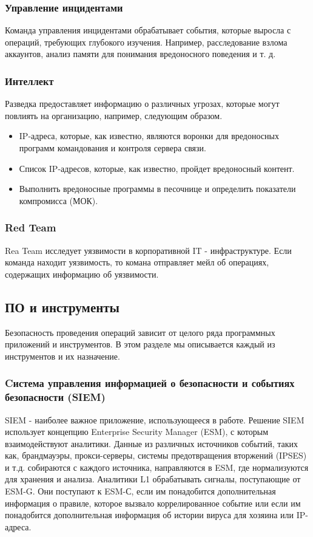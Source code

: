 \documentclass[12pt,]{article}
\begin{document}
\subsubsection{Управление инцидентами}
Команда управления инцидентами обрабатывает события, которые выросла с операций, требующих глубокого изучения. Например, расследование взлома аккаунтов, анализ памяти для понимания вредоносного поведения и т. д.
\subsubsection{Интеллект}
Разведка предоставляет информацию о различных угрозах, которые могут повлиять на организацию, например, следующим образом.
\begin{itemize}
\item IP-адреса, которые, как известно, являются воронки для вредоносных программ  командования и контроля сервера связи.
\item Список IP-адресов, которые, как известно, пройдет вредоносный контент.
\item Выполнить вредоносные программы в песочнице и определить показатели компромисса (МОК).
\end{itemize}
\subsubsection{Red Team}
Rea Team исследует уязвимости в корпоративной IT - инфраструктуре. Если команда находит  уязвимость, то комана отправляет мейл об операциях, содержащих информацию об уязвимости.
\subsection{ПО и инструменты}
Безопасность проведения операций зависит от целого ряда программных приложений и инструментов. В этом разделе мы описывается каждый из инструментов и их назначение.
\subsubsection{Cистема управления информацией о безопасности и событиях безопасности (SIEM)}
SIEM  - наиболее важное приложение, использующееся в работе. Решение SIEM использует концепцию Enterprise Security Manager (ESM), с которым взаимодействуют аналитики. Данные из различных источников событий, таких как, брандмауэры, прокси-серверы, системы предотвращения вторжений (IPSES) и т.д. собираются с каждого источника, направляются в ESM, где нормализуются для хранения и анализа. Аналитики L1 обрабатывать сигналы, поступающие от ESM-G. Они поступают к ESM-С, если им понадобится дополнительная информация о правиле, которое вызвало коррелированное событие или если им понадобится дополнительная информация об истории вируса для хозяина или IP-адреса.
\end{document}
